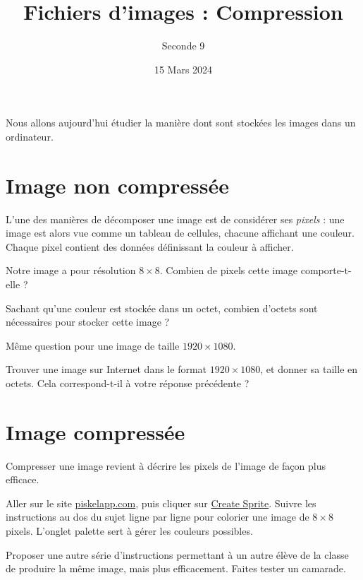\documentclass{article}
\title{Fichiers d'images : Compression}
\date{15 Mars 2024}
\author{Seconde 9}
\begin{document}
\maketitle
\thispagestyle{empty}
\pagestyle{empty}
Nous allons aujourd'hui étudier la manière dont sont stockées les images dans un ordinateur.

\section{Image non compressée}
L'une des manières de décomposer une image est de considérer ses \emph{pixels} : une image est alors vue comme un tableau de cellules, chacune affichant une couleur. Chaque pixel contient des données définissant la couleur à afficher.

\begin{enumquestions}
\item Notre image a pour résolution $8 \times 8$. Combien de pixels cette image comporte-t-elle ?
\item Sachant qu'une couleur est stockée dans un octet, combien d'octets sont nécessaires pour stocker cette image ?
\item Même question pour une image de taille $1920 \times 1080$.
\item Trouver une image sur Internet dans le format $1920 \times 1080$, et donner sa taille en octets. Cela correspond-t-il à votre réponse précédente ?
\end{enumquestions}

\section{Image compressée}

Compresser une image revient à décrire les pixels de l'image de façon plus efficace.
\begin{enumquestions}
\item Aller sur le site \url{piskelapp.com}, puis cliquer sur \url{Create Sprite}. Suivre les instructions au dos du sujet ligne par ligne pour colorier une image de $8 \times 8$ pixels. L'onglet palette sert à gérer les couleurs possibles.
\item Proposer une autre série d'instructions permettant à un autre élève de la classe de produire la même image, mais plus efficacement. Faites tester un camarade.
\end{enumquestions}

\newpage 
\end{document}
